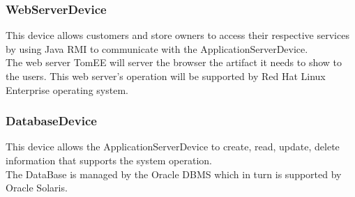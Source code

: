 \subsubsection{WebServerDevice}
This device allows customers and store owners to access their respective services by using Java RMI to communicate with the ApplicationServerDevice.\\
The web server TomEE will server the browser the artifact it needs to show to the users. This web server's operation will be supported by Red Hat Linux Enterprise operating system.
\subsubsection{DatabaseDevice}
This device allows the ApplicationServerDevice to create, read, update, delete information that supports the system operation.\\
The DataBase is managed by the Oracle DBMS which in turn is supported by Oracle Solaris.